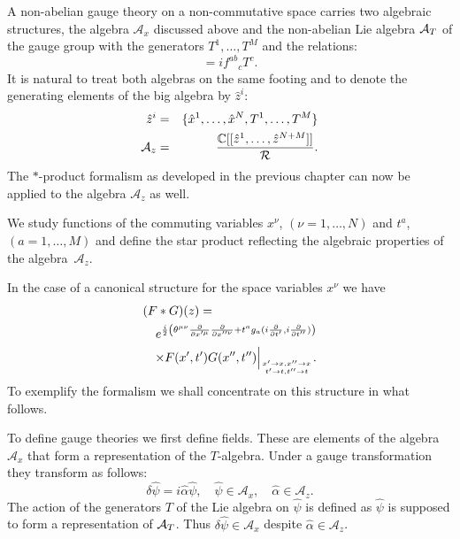 \documentclass[a4paper,11pt]{article}
\def\nn{\nonumber }
\def\Ax{{\mathcal{A}_x}}
\def\Az{{\mathcal{A}_z}}
\def\x{\hat x}
\def\z{\hat z}
\def\pat{\partial}
\begin{document}
A non-abelian gauge theory on a non-commutative space carries
two algebraic structures, the algebra $\Ax$ discussed
above and the non-abelian Lie algebra ${\cal A}_T$ of the gauge group 
with the generators $T^1,\ldots,T^M$ and the relations:
\begin{equation}
  [T^a,T^b]=if^{ab}{}_cT^c.
\end{equation}
It is natural to treat both algebras on the same footing and
to denote the generating elements of the big algebra by $\z^i$:
\begin{eqnarray}
  \z^i&=&\{\x^1,\ldots,\x^N,T^1,\ldots,T^M\}\nn\\
  \Az&=&\frac{\mathbb{C}[[\z^1,\ldots, \z^{N+M}]]}{\cal R}.
\end{eqnarray}
The $*$-product formalism as developed in the previous chapter
can now be applied to the algebra $\Az$ as well.

We study functions of the commuting variables $x^{\nu}$, $(\nu=1,\ldots, N)$ and
$t^a$, $(a=1,\ldots,M)$ and define the star product reflecting the algebraic
properties of the algebra~$\Az$.

In the case of a canonical structure for the space variables
$x^{\nu}$ we have
\begin{eqnarray} \label{blub}
  \lefteqn{(F*G)(z)=}\nn\\
  &&e^{\frac{i}{2}\left(\theta^{\mu\nu}
  \frac{\pat}{\pat x'^{\mu}}
  \frac{\pat}{\pat x''^{\nu}}+t^ag_a(i
  \frac{\pat}{\pat t'},i\frac{\pat}{\pat t''})\right)}\nn\\
  &&\times F(x',t')G(x'',t'')\Big|_{x'\to x, x''\to x\atop t'\to t, t''\to t}. 
\end{eqnarray}
To exemplify the formalism we shall concentrate on this structure in what follows. 

To define gauge theories we first define fields. These are
elements of the algebra $\Ax$ that form a representation of the
$T$-algebra. Under a  gauge transformation they transform as
follows:
\begin{equation}
\label{gaugetrafo}
  \delta\hat{\psi}=i\hat{\alpha}\hat{\psi},\quad \hat{\psi}\in\Ax,\quad \hat{\alpha}\in\Az.
\end{equation}
The action of the generators $T$ of the Lie algebra on 
$\hat{\psi}$ is defined as $\hat{\psi}$ is supposed to form a representation of ${\cal A}_T$.
Thus $\delta\hat{\psi}\in\Ax$ despite $\hat{\alpha}\in\Az$.
\end{document}
